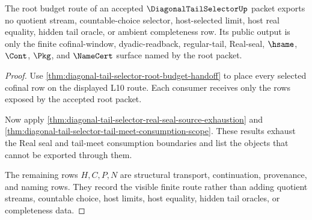 \begin{theorem}
\label{thm:diagonal-tail-selector-root-seal-nonescape}
The root budget route of an accepted $\DiagonalTailSelectorUp$ packet exports
no quotient stream, countable-choice selector, host-selected limit, host real
equality, hidden tail oracle, or ambient completeness row. Its public output
is only the finite cofinal-window, dyadic-readback, regular-tail, Real-seal,
$\hsame$, $\Cont$, $\Pkg$, and $\NameCert$ surface named by the root packet.
\end{theorem}
\begin{proof}
Use \autoref{thm:diagonal-tail-selector-root-budget-handoff} to place every
selected cofinal row on the displayed L10 route. Each consumer receives only
the rows exposed by the accepted root packet.

Now apply \autoref{thm:diagonal-tail-selector-real-seal-source-exhaustion}
and \autoref{thm:diagonal-tail-selector-tail-meet-consumption-scope}. These
results exhaust the Real seal and tail-meet consumption boundaries and list
the objects that cannot be exported through them.

The remaining rows $H,C,P,N$ are structural transport, continuation,
provenance, and naming rows. They record the visible finite route rather than
adding quotient streams, countable choice, host limits, host equality, hidden
tail oracles, or completeness data.
\end{proof}

